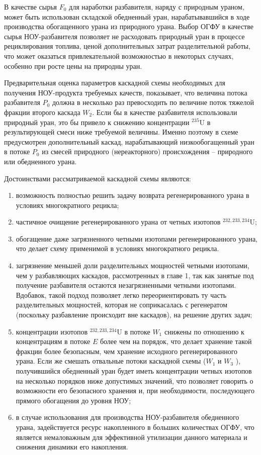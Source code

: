 В качестве сырья $F_0$ для наработки разбавителя, наряду с природным ураном, может быть использован складской обедненный уран, нарабатывавшийся в ходе производства обогащенного урана из природного урана. Выбор ОГФУ в качестве сырья НОУ-разбавителя позволяет не расходовать природный уран в процессе рециклирования топлива, ценой дополнительных затрат разделительной работы, что может оказаться привлекательной возможностью в некоторых случаях, особенно при росте цены на природны уран.

Предварительная оценка параметров каскадной схемы необходимых для получения НОУ-продукта требуемых качеств, показывает, что величина потока разбавителя $P_0$ должна в несколько раз превосходить по величине поток тяжелой фракции второго каскада $W_2$. Если бы в качестве разбавителя использовали природный уран, это бы привело к снижению концентрации $^{235}$U в результирующей смеси ниже требуемой величины. Именно поэтому в схеме предусмотрен дополнительный каскад, нарабатывающий низкообогащенный уран в потоке $P_0$ из смесей природного (нереакторного) происхождения -- природного или обедненного урана.

Достоинствами рассматриваемой каскадной схемы являются:

\begin{enumerate}
    \item возможность полностью решить задачу возврата регенерированного урана в условиях многократного рецикла;
    \item частичное очищение регенерированного урана от четных изотопов $^{232,233,234}$U;
    \item обогащение даже загрязненного четными изотопами регенерированного урана, что делает схему применимой в условиях многократного рецикла.
    \item загрязнение меньшей доли разделительных мощностей четными изотопами, чем у разбавляющих каскадов, рассмотренных в главе 1, так как занятые под получение разбавителя остаются незагрязненными четными изотопами. Вдобавок, такой подход позволяет легко переориентировать ту часть разделительных мощностей, которая не соприкасалась с регенератом (поскольку разбавление происходит вне каскадов), на решение других задач;
    \item концентрации изотопов $^{232,233,234}$U в потоке $W_1$ снижены по отношению к концентрациям в потоке $E$ более чем на порядок, что делает хранение такой фракции более безопасным, чем хранение исходного регенерированного урана. Если же смешать отвальные потоки каскадной схемы ($W_1$  и $W_3$ ), получившийся обедненный уран будет иметь концентрации четных изотопов на несколько порядков ниже допустимых значений, что позволяет говорить о возможности его безопасного хранения и, при необходимости, последующего прямого обогащения до уровня НОУ;
    \item в случае использования для производства НОУ-разбавителя обедненного урана, задействуется ресурс накопленного в больших количествах ОГФУ, что является немаловажным для эффективной утилизации данного материала и снижения динамики его накопления.
\end{enumerate}

